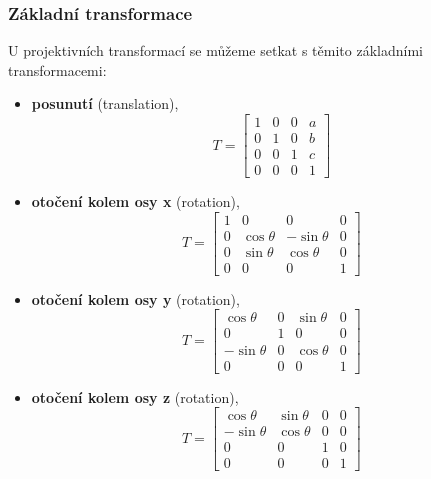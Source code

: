\subsubsection{Základní transformace}
U projektivních transformací se můžeme setkat s těmito základními transformacemi:
\begin{itemize}
	\item \textbf{posunutí} (translation),
	\begin{equation*}
	T = \begin{bmatrix}
	1 & 0 & 0 & a      \\[0.3em]
	0 & 1 & 0 & b      \\[0.3em]
	0 & 0 & 1 & c      \\[0.3em]
	0 & 0 & 0 & 1      
	\end{bmatrix}
	\end{equation*}
	\item \textbf{otočení kolem osy x} (rotation),
	\begin{equation*}
	T = 	\begin{bmatrix}
	1 & 0 & 0 & 0        					\\[0.3em]
	0 & \cos{\theta} & -\sin{\theta} & 0    	\\[0.3em]
	0 & \sin{\theta} & \cos{\theta} & 0       \\[0.3em]
	0 & 0 & 0 & 1      
	\end{bmatrix}
	\end{equation*}
	\item \textbf{otočení kolem osy y} (rotation),
	\begin{equation*}
	T = 	\begin{bmatrix}
	\cos{\theta} & 0 & \sin{\theta} &  0      	\\[0.3em]
	0 & 1 & 0 & 0        						\\[0.3em]
	-\sin{\theta} & 0 & \cos{\theta} & 0       \\[0.3em]
	0 & 0 & 0 & 1      
	\end{bmatrix}
	\end{equation*}
	\item \textbf{otočení kolem osy z} (rotation),
	\begin{equation*}
	T = 	\begin{bmatrix}
	\cos{\theta} & \sin{\theta} & 0  & 0      	\\[0.3em]
	-\sin{\theta} & \cos{\theta} & 0 & 0       \\[0.3em]
	0 & 0 & 1 & 0        						\\[0.3em]
	0 & 0 & 0 & 1      
	\end{bmatrix}

\end{equation*}
\end{itemize}
